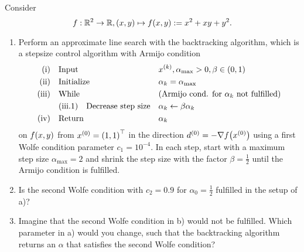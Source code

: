 \documentclass[english]{exercise}
\begin{document}
	Consider
	\[
		f: \R^2 \to \R, \parentheses*{x, y} \mapsto f\parentheses*{x, y} := x^2 + xy + y^2.
	\]
	\begin{enumerate}
		\item Perform an approximate line search with the backtracking algorithm, which is a stepsize control algorithm with Armijo condition
		\begin{align*}
			\text{(i)} \quad & \text{Input} && x^{\parentheses*{k}}, \alpha_{\text{max}} > 0, \beta \in \parentheses*{0, 1}\\
			\text{(ii)} \quad & \text{Initialize} && \alpha_k = \alpha_{\text{max}}\\
			\text{(iii)} \quad & \text{While} && \text{(Armijo cond. for }\alpha_k\text{ not fulfilled)}\\
			& \text{(iii.1)} \quad \text{Decrease step size} && \alpha_k \gets \beta\alpha_k\\
			\text{(iv)} \quad & \text{Return} && \alpha_k
		\end{align*}
		on \(f\parentheses*{x, y}\) from \(x^{\parentheses*{0}} = \parentheses*{1, 1}^\top\) in the direction \(d^{\parentheses*{0}} = -\nabla f\parentheses*{x^{\parentheses*{0}}}\) using a first Wolfe condition parameter \(c_1 = 10^{-4}\).
		In each step, start with a maximum step size \(\alpha_{\text{max}} = 2\) and shrink the step size with the factor \(\beta = \frac{1}{2}\) until the Armijo condition is fulfilled.
		\item Is the second Wolfe condition with \(c_2 = 0.9\) for \(\alpha_0 = \frac{1}{2}\) fulfilled in the setup of a)?
		\item Imagine that the second Wolfe condition in b) would not be fulfilled.
		Which parameter in a) would you change, such that the backtracking algorithm returns an \(\alpha\) that satisfies the second Wolfe condition?
	\end{enumerate}
\end{document}
